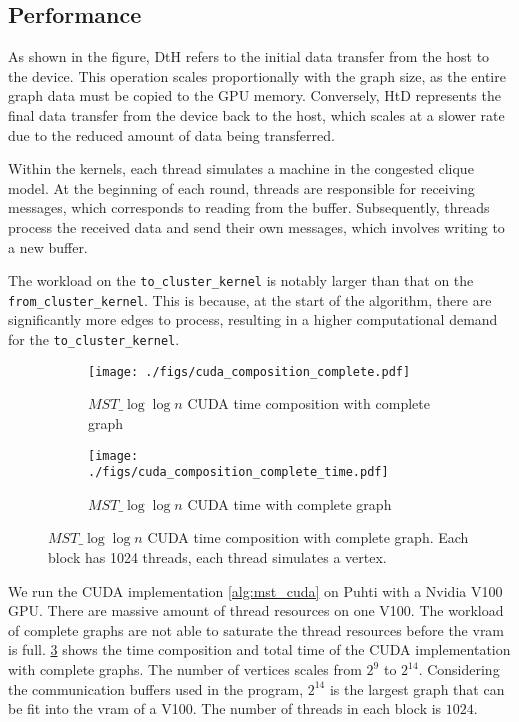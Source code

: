 \documentclass[english, 12pt, a4paper, elec, utf8, a-2b, online]{aaltothesis}
\newcommand{\mstalgo}{$MST\_\log\log{n}$}
\begin{document}
\subsection{Performance}
\begin{tcolorbox}[colback=white,colframe=black,boxrule=1pt,arc=0pt]
As shown in the figure, DtH refers to the initial data transfer from the host to the device. This operation scales proportionally with the graph size, as the entire graph data must be copied to the GPU memory. Conversely, HtD represents the final data transfer from the device back to the host, which scales at a slower rate due to the reduced amount of data being transferred.

Within the kernels, each thread simulates a machine in the congested clique model. At the beginning of each round, threads are responsible for receiving messages, which corresponds to reading from the buffer. Subsequently, threads process the received data and send their own messages, which involves writing to a new buffer.

The workload on the \texttt{to\_cluster\_kernel} is notably larger than that on the \texttt{from\_cluster\_kernel}. This is because, at the start of the algorithm, there are significantly more edges to process, resulting in a higher computational demand for the \texttt{to\_cluster\_kernel}.
\end{tcolorbox}

\begin{figure}[h]
	\begin{subfigure}[b]{0.45\textwidth}
		\centering
		\texttt{[image: ./figs/cuda\_composition\_complete.pdf]}
		\caption{\mstalgo{} CUDA time composition with complete graph}
		\label{fig:cuda_composition_complete.pdf}
	\end{subfigure}
	\begin{subfigure}[b]{0.45\textwidth}
		\centering
		\texttt{[image: ./figs/cuda\_composition\_complete\_time.pdf]}
		\caption{\mstalgo{} CUDA time with complete graph}
		\label{fig:cuda_composition_complete_time.pdf}
	\end{subfigure}
	\caption{\mstalgo{} CUDA time composition with complete graph. Each block has 1024 threads, each thread simulates a vertex.}
	\label{fig:cuda_composition_complete}
\end{figure}

We run the CUDA implementation \cref{alg:mst_cuda} on Puhti with a Nvidia V100 GPU. There are massive amount of thread resources on one V100. The workload of complete graphs are not able to saturate the thread resources before the vram is full. \cref{fig:cuda_composition_complete} shows the time composition and total time of the CUDA implementation with complete graphs. The number of vertices scales from $2^{9}$ to $2^{14}$. Considering the communication buffers used in the program, $2^{14}$ is the largest graph that can be fit into the vram of a V100. The number of threads in each block is $1024$.
\end{document}
